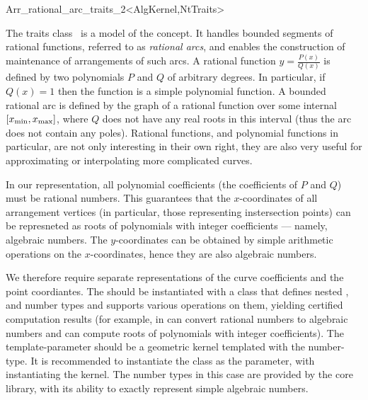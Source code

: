 
\ccRefPageBegin
\begin{ccRefClass}{Arr_rational_arc_traits_2<AlgKernel,NtTraits>}

\ccDefinition

The traits class \ccRefName\ is a model of the 
concept. It handles bounded segments of rational functions, referred to as
{\sl rational arcs}, and enables the construction of maintenance of arrangements
of such arcs. A rational function $y = \frac{P(x)}{Q(x)}$ is defined by two
polynomials $P$ and $Q$ of arbitrary degrees. In particular, if $Q(x) = 1$
then the function is a simple polynomial function. A bounded rational arc is
defined by the graph of a rational function over some internal
$[x_{\rm min}, x_{\rm max}]$, where $Q$ does not have any real roots in this
interval (thus the arc does not contain any poles).
Rational functions, and polynomial functions in particular, are
not only interesting in their own right, they are also very useful
for approximating or interpolating more complicated curves.

In our representation, all polynomial coefficients (the coefficients of $P$
and $Q$) must be rational numbers. This guarantees that the
$x$-coordinates of all arrangement vertices (in particular, those
representing instersection points) can be represneted as roots of
polynomials with integer coefficients --- namely, algebraic numbers.
The $y$-coordinates can be obtained by simple arithmetic operations on
the $x$-coordinates, hence they are also algebraic numbers.

We therefore require separate representations of the curve coefficients and
the point coordiantes. The  should be instantiated with a class
that defines nested ,  and  number
types and supports various operations on them, yielding certified computation
results (for example, in can convert rational numbers to algebraic numbers
and can compute roots of polynomials with integer coefficients).
The  template-parameter should be a geometric kernel templated
with the  number-type. It is recommended to
instantiate the  class as the 
parameter, with  instantiating the kernel.
The number types in this case are provided by the {\sc core} library, with its
ability to exactly represent simple algebraic numbers.


\end{ccRefClass}
